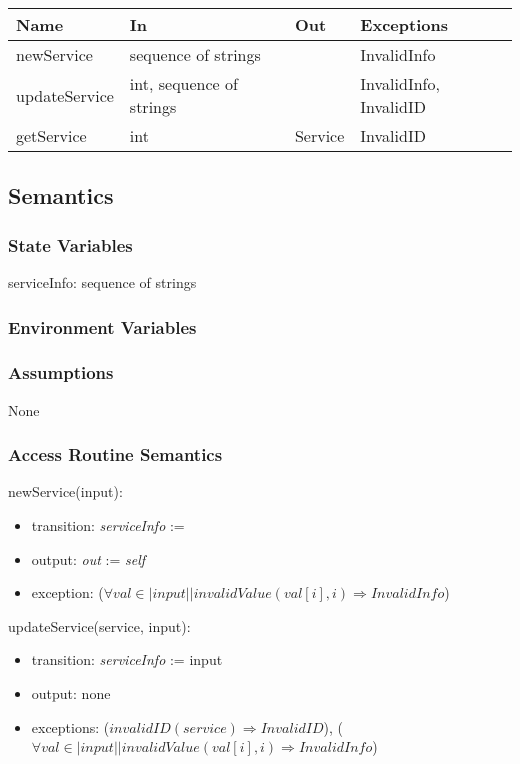 \documentclass[12pt, titlepage]{article}
\begin{document}
\begin{center}
\begin{tabular}{p{3cm} p{4cm} p{4cm} p{2cm}}
\hline
\textbf{Name} & \textbf{In} & \textbf{Out} & \textbf{Exceptions} \\
\hline
newService & sequence of strings &  & InvalidInfo \\
updateService & int, sequence of strings &  & InvalidInfo, InvalidID \\
getService & int & Service & InvalidID \\
\hline
\end{tabular}
\end{center}

\subsection{Semantics}

\subsubsection{State Variables}

serviceInfo: sequence of strings

\subsubsection{Environment Variables}


\subsubsection{Assumptions}
None

\subsubsection{Access Routine Semantics}

\noindent newService(input):
\begin{itemize}
\item transition: \textit{serviceInfo} := 
\item output: \textit{out} := \textit{self}
\item exception: ($\forall val \in |input| | invalidValue(val[i], i) \Rightarrow InvalidInfo$)
\end{itemize}

\noindent updateService(service, input):
\begin{itemize}
\item transition: \textit{serviceInfo} := input
\item output: none
\item exceptions: ($invalidID(service) \Rightarrow InvalidID$), ($\forall val \in |input| | invalidValue(val[i], i) \Rightarrow InvalidInfo$)
\end{itemize}
\end{document}
